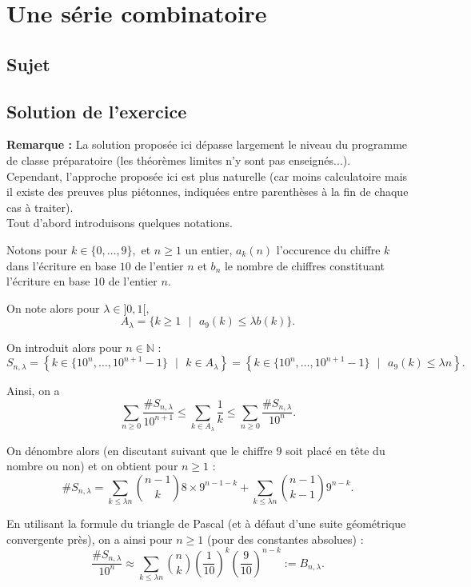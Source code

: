 \chapter{Une série combinatoire}

\section{Sujet}

\section{Solution de l'exercice}

\textbf{Remarque : } La solution proposée ici dépasse largement le niveau du programme de classe préparatoire (les théorèmes limites n'y sont pas enseignés...). Cependant, l'approche proposée ici est plus naturelle (car moins calculatoire mais il existe des preuves plus piétonnes, indiquées entre parenthèses à la fin de chaque cas  à traiter).\\

Tout d'abord introduisons quelques notations.

Notons pour $k\in\{0,\ldots,9\},$ et $n\geq 1$ un entier, $\displaystyle a_{k}(n)$ l'occurence du chiffre $k$ dans l'écriture en base $10$ de l'entier $n$ et $b_{n}$ le nombre de chiffres constituant l'écriture en base $10$  de l'entier $n.$

On note alors pour $\lambda\in]0,1[,$ $$ A_{\lambda}=\{k\geq 1\mbox{ }|\mbox{ }a_{9}(k)\leq \lambda b(k)\}.$$

On introduit alors pour $n\in \mathbb{N}$ : $$ S_{n,\lambda}=\left\{ k\in\{10^{n},\ldots,10^{n+1}-1\}\mbox{ }|\mbox{ } k\in A_{\lambda} \right\}=\left\{ k\in\{10^{n},\ldots,10^{n+1}-1\}\mbox{ }|\mbox{ } a_{9}(k)\leq \lambda n\right\}.$$

Ainsi, on a $$ \sum_{n\geq 0}\frac{\# S_{n,\lambda}}{10^{n+1}}\leq \sum_{k\in A_{\lambda}}\frac{1}{k}\leq \sum_{n\geq 0}\frac{\# S_{n,\lambda}}{10^{n}}.$$

On dénombre alors (en discutant suivant que le chiffre $9$ soit placé en tête du nombre ou non) et on obtient pour $n\geq 1$  : $$\# S_{n,\lambda}=\sum_{k\leq \lambda n}\binom{n-1}{k}8\times 9^{n-1-k} + \sum_{k\leq \lambda n}\binom{n-1}{k-1}9^{n-k}.$$

En utilisant la formule du triangle de Pascal (et à défaut d'une suite géométrique convergente près), on a ainsi pour $n\geq 1$ (pour des constantes absolues) : $$ \frac{\# S_{n,\lambda}}{10^{n}}\approx \sum_{k\leq \lambda n}\binom{n}{k}(\frac{1}{10})^{k}(\frac{9}{10})^{n-k}:=B_{n,\lambda}.$$

